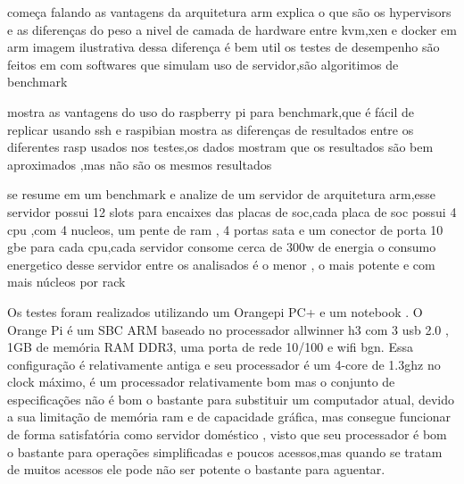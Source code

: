 \documentclass[
	12pt,				%
	openright,			%
	oneside,			%
	a4paper,			%
	english,			%
	french,				%
	spanish,			%
	brazil,				%
	]{abntex2}
\begin{document}
começa falando as vantagens da arquitetura arm
explica o que são os hypervisors e as diferenças do peso a nivel de camada de hardware entre kvm,xen e docker em arm
imagem ilustrativa dessa diferença é bem util
os testes de desempenho são feitos em com softwares que simulam uso de servidor,são algoritimos de benchmark
\cite{KVMXenDocker}

mostra as vantagens do uso do raspberry pi para benchmark,que é fácil de replicar usando ssh e raspibian
mostra as diferenças de resultados entre os diferentes rasp usados nos testes,os dados mostram que os resultados são bem aproximados ,mas não são os mesmos resultados
\cite{rpiplatformreplicable}

se resume em um benchmark e analize de um servidor de arquitetura arm,esse servidor possui 12 slots para encaixes das placas de soc,cada placa de soc possui 4 cpu ,com 4 nucleos, um pente de ram , 4 portas sata e um conector de porta 10 gbe para cada cpu,cada servidor consome cerca de 300w de energia
o consumo energetico desse servidor entre os analisados é o menor , o mais potente e com mais núcleos por rack
\cite{hs06}

Os testes foram realizados utilizando um Orangepi PC+ \cite{opipc} e um notebook .
O Orange Pi é um SBC ARM baseado no processador allwinner h3 \cite{h3} com 3 usb 2.0 , 1GB de memória RAM DDR3, uma porta de rede 10/100 e wifi bgn. Essa configuração é relativamente antiga e seu processador é um 4-core de 1.3ghz no clock máximo,
é um processador relativamente bom mas o conjunto de especificações não é bom o bastante para substituir um computador atual,
devido a sua limitação de memória ram e de capacidade gráfica, mas consegue funcionar de forma satisfatória como servidor doméstico ,
visto que seu processador é bom o bastante para operações simplificadas e poucos acessos,mas quando se tratam de muitos acessos ele pode não ser potente o bastante para aguentar.
\end{document}
